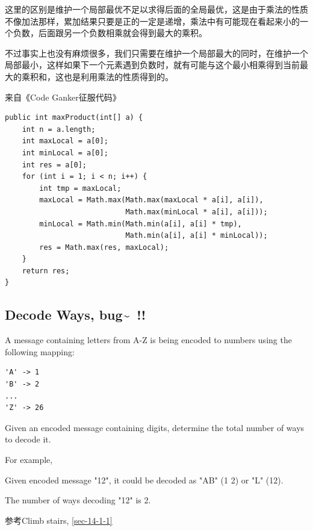\documentclass[12pt]{book}
\begin{document}
这里的区别是维护一个局部最优不足以求得后面的全局最优，这是由于乘法的性质不像加法那样，累加结果只要是正的一定是递增，乘法中有可能现在看起来小的一个负数，后面跟另一个负数相乘就会得到最大的乘积。

不过事实上也没有麻烦很多，我们只需要在维护一个局部最大的同时，在维护一个局部最小，这样如果下一个元素遇到负数时，就有可能与这个最小相乘得到当前最大的乘积和，这也是利用乘法的性质得到的。

来自《Code Ganker征服代码》

\lstset{language=java,label= ,caption= ,numbers=none}
\begin{lstlisting}
public int maxProduct(int[] a) {
    int n = a.length;
    int maxLocal = a[0];
    int minLocal = a[0];
    int res = a[0];
    for (int i = 1; i < n; i++) {
        int tmp = maxLocal;
        maxLocal = Math.max(Math.max(maxLocal * a[i], a[i]),
                            Math.max(minLocal * a[i], a[i]));
        minLocal = Math.min(Math.min(a[i], a[i] * tmp),
                            Math.min(a[i], a[i] * minLocal));
        res = Math.max(res, maxLocal);
    }
    return res; 
}
\end{lstlisting}
\subsection{Decode Ways, bug\textasciitilde{}~!!}
\label{sec-14-2-8}
A message containing letters from A-Z is being encoded to numbers using the following mapping:
\lstset{language=java,label= ,caption= ,numbers=none}
\begin{lstlisting}
'A' -> 1
'B' -> 2
...
'Z' -> 26
\end{lstlisting}

Given an encoded message containing digits, determine the total number of ways to decode it.

For example,

Given encoded message "12", it could be decoded as "AB" (1 2) or "L" (12).

The number of ways decoding "12" is 2.

参考Climb stairs, \ref{sec-14-1-1}
\end{document}
